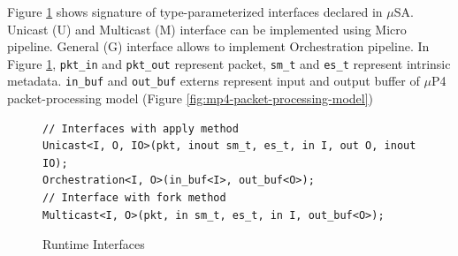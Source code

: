 Figure \ref{fig:interfaces} shows signature of type-parameterized interfaces declared in $\mu$SA.
Unicast (U) and Multicast (M) interface can be implemented using Micro pipeline.
General (G) interface allows to implement Orchestration pipeline.
In Figure \ref{fig:interfaces}, \texttt{pkt\_in} and \texttt{pkt\_out} represent packet, \texttt{sm\_t} and \texttt{es\_t} represent intrinsic metadata.
\texttt{in\_buf} and \texttt{out\_buf} externs represent input and output buffer of $\mu$P4 packet-processing model (Figure \ref{fig:mp4-packet-processing-model})
\begin{figure}[H]
\begin{lstlisting}[frame=none]
// Interfaces with apply method
Unicast<I, O, IO>(pkt, inout sm_t, es_t, in I, out O, inout IO);
Orchestration<I, O>(in_buf<I>, out_buf<O>);
// Interface with fork method
Multicast<I, O>(pkt, in sm_t, es_t, in I, out_buf<O>);
\end{lstlisting}
\caption{Runtime Interfaces}
\label{fig:interfaces}
\end{figure}

